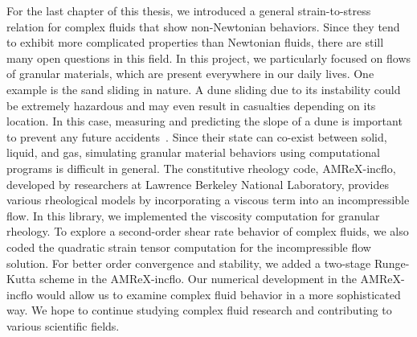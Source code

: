 For the last chapter of this thesis, we introduced a general strain-to-stress relation for complex fluids that show non-Newtonian behaviors. 
Since they tend to exhibit more complicated properties than Newtonian fluids,
there are still many open questions in this field.
In this project, we particularly focused on flows of granular materials, which are present everywhere in our daily lives. 
One example is the sand sliding in nature. A dune sliding due to its instability could be extremely hazardous and may even result in casualties depending on its location. In this case, measuring and predicting the slope of a dune is important to prevent any future accidents~\cite{xie_summary_2021}.
Since their state can co-exist between solid, liquid, and gas, simulating granular material behaviors using computational programs is difficult in general. 
The constitutive rheology code, AMReX-incflo, developed by researchers at Lawrence Berkeley National Laboratory, provides various rheological models by incorporating a viscous term into an incompressible flow. 
In this library, we implemented the viscosity computation for granular rheology. 
To explore a second-order shear rate behavior of complex fluids, we also coded the quadratic strain tensor computation for the incompressible flow solution. 
For better order convergence and stability, we added a two-stage Runge-Kutta scheme in the AMReX-incflo. 
Our numerical development in the AMReX-incflo would allow us to examine complex fluid behavior in a more sophisticated way.
We hope to continue studying complex fluid research and contributing to various scientific fields. 
